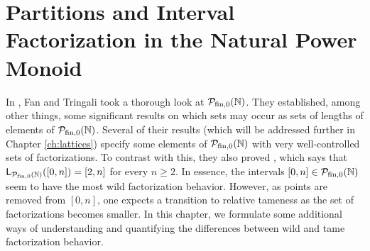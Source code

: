 \chapter{Partitions and Interval Factorization in the Natural Power Monoid} \label{ch:partitions}


In \cite[Section 4]{fan-tringali18}, Fan and Tringali took a thorough look at ${\mathcal{P}_{\textrm{fin},0}(\mathbb{N})}$.
They established, among other things, some significant results on which sets may occur as sets of lengths of elements of ${\mathcal{P}_{\textrm{fin},0}(\mathbb{N})}$.  
Several of their results (which will be addressed further in Chapter \ref{ch:lattices}) specify some elements of ${\mathcal{P}_{\textrm{fin},0}(\mathbb{N})}$ with very well-controlled sets of factorizations.
To contrast with this, they also proved \cite[Proposition 4.8]{fan-tringali18}, which says that $\mathsf{L}_{\mathcal{P}_{\textrm{fin},0}(\mathbb{N})}([ 0,n ]) = [ 2,n ]$ for every $n\ge 2$.
In essence, the intervals $[ 0,n ]\in {\mathcal{P}_{\textrm{fin},0}(\mathbb{N})}$ seem to have the most wild factorization behavior.
However, as points are removed from $[ 0,n ]$, one expects a transition to relative tameness as the set of factorizations becomes smaller.
In this chapter, we formulate some additional ways of understanding and quantifying the differences between wild and tame factorization behavior.





